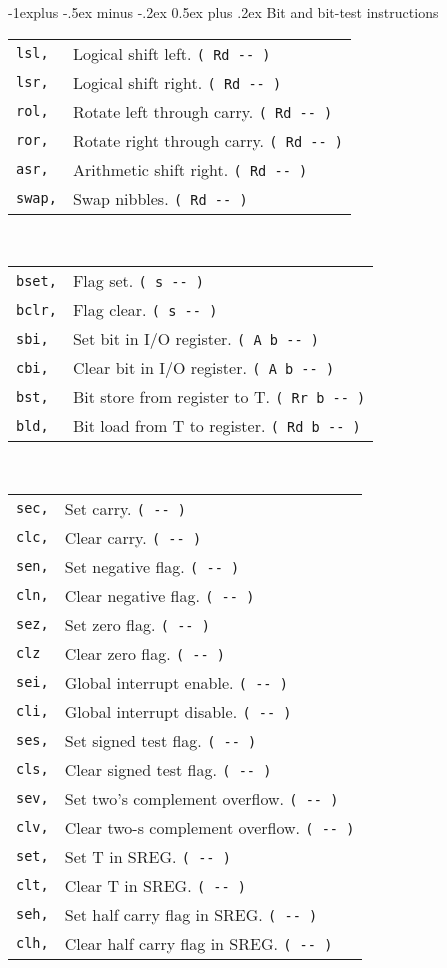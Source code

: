 \documentclass[10pt,landscape,a4paper]{article}
\makeatletter
\renewcommand{\subsection}{\@startsection{subsection}{2}{0mm}%
                                {-1explus -.5ex minus -.2ex}%
                                {0.5ex plus .2ex}%
                                {\normalfont\normalsize\bfseries}}
\makeatother
\begin{document}
\begin{multicols}{3}
\subsection{Bit and bit-test instructions}
\begin{tabular}{@{}ll@{}}
\verb!lsl,! & Logical shift left. \verb!( Rd -- )! \\
\verb!lsr,! & Logical shift right. \verb!( Rd -- )! \\
\verb!rol,! & Rotate left through carry. \verb!( Rd -- )! \\
\verb!ror,! & Rotate right through carry. \verb!( Rd -- )! \\
\verb!asr,! & Arithmetic shift right. \verb!( Rd -- )! \\
\verb!swap,! & Swap nibbles. \verb!( Rd -- )! \\
\end{tabular}\\
\begin{tabular}{@{}ll@{}}
\verb!bset,! & Flag set. \verb!( s -- )! \\
\verb!bclr,! & Flag clear. \verb!( s -- )! \\
\verb!sbi,! & Set bit in I/O register. \verb!( A b -- )! \\
\verb!cbi,! & Clear bit in I/O register. \verb!( A b -- )! \\
\verb!bst,! & Bit store from register to T. \verb!( Rr b -- )! \\
\verb!bld,! & Bit load from T to register. \verb!( Rd b -- )! \\
\end{tabular}\\
\begin{tabular}{@{}ll@{}}
\verb!sec,! & Set carry. \verb!( -- )! \\
\verb!clc,! & Clear carry. \verb!( -- )! \\
\verb!sen,! & Set negative flag. \verb!( -- )! \\
\verb!cln,! & Clear negative flag. \verb!( -- )! \\
\verb!sez,! & Set zero flag. \verb!( -- )! \\
\verb!clz! & Clear zero flag. \verb!( -- )! \\
\verb!sei,! & Global interrupt enable. \verb!( -- )! \\
\verb!cli,! & Global interrupt disable. \verb!( -- )! \\
\verb!ses,! & Set signed test flag. \verb!( -- )! \\
\verb!cls,! & Clear signed test flag. \verb!( -- )! \\
\verb!sev,! & Set two's complement overflow. \verb!( -- )! \\
\verb!clv,! & Clear two-s complement overflow. \verb!( -- )! \\
\verb!set,! & Set T in SREG. \verb!( -- )! \\
\verb!clt,! & Clear T in SREG. \verb!( -- )! \\
\verb!seh,! & Set half carry flag in SREG. \verb!( -- )! \\
\verb!clh,! & Clear half carry flag in SREG. \verb!( -- )! \\
\end{tabular}


\end{multicols}
\end{document}
